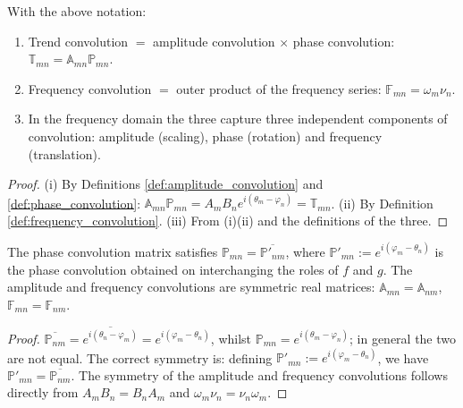 \begin{proposition}\label{prop:three_convolutions_relation}
With the above notation:
\begin{enumerate}[label=(\roman*)]
    \item Trend convolution $=$ amplitude convolution $\times$ phase convolution: $\mathbb{T}_{mn} = \mathbb{A}_{mn} \mathbb{P}_{mn}$.
    \item Frequency convolution $=$ outer product of the frequency series: $\mathbb{F}_{mn} = \omega_m \nu_n$.
    \item In the frequency domain the three capture three independent components of convolution: amplitude (scaling), phase (rotation) and frequency (translation).
\end{enumerate}
\end{proposition}

\begin{proof}
(i) By Definitions \ref{def:amplitude_convolution} and \ref{def:phase_convolution}: $\mathbb{A}_{mn}\mathbb{P}_{mn} = A_m B_n e^{i(\theta_m - \varphi_n)} = \mathbb{T}_{mn}$.
(ii) By Definition \ref{def:frequency_convolution}.
(iii) From (i)(ii) and the definitions of the three.
\end{proof}

\begin{proposition}\label{prop:phase_convolution_symmetry}
The phase convolution matrix satisfies $\mathbb{P}_{mn} = \overline{\mathbb{P}'_{nm}}$, where $\mathbb{P}'_{mn} := e^{i(\varphi_m - \theta_n)}$ is the phase convolution obtained on interchanging the roles of $f$ and $g$. The amplitude and frequency convolutions are symmetric real matrices: $\mathbb{A}_{mn} = \mathbb{A}_{nm}$, $\mathbb{F}_{mn} = \mathbb{F}_{nm}$.
\end{proposition}

\begin{proof}
$\overline{\mathbb{P}_{nm}} = \overline{e^{i(\theta_n - \varphi_m)}} = e^{i(\varphi_m - \theta_n)}$, whilst $\mathbb{P}_{mn} = e^{i(\theta_m - \varphi_n)}$; in general the two are not equal. The correct symmetry is: defining $\mathbb{P}'_{mn} := e^{i(\varphi_m - \theta_n)}$, we have $\mathbb{P}'_{mn} = \overline{\mathbb{P}_{nm}}$. The symmetry of the amplitude and frequency convolutions follows directly from $A_m B_n = B_n A_m$ and $\omega_m \nu_n = \nu_n \omega_m$.
\end{proof}

